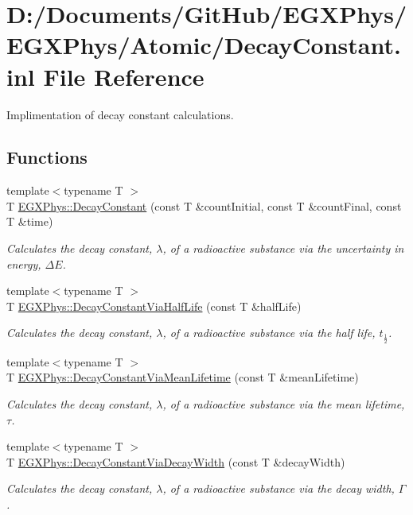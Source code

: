 \hypertarget{_decay_constant_8inl}{}\section{D\+:/\+Documents/\+Git\+Hub/\+E\+G\+X\+Phys/\+E\+G\+X\+Phys/\+Atomic/\+Decay\+Constant.inl File Reference}
\label{_decay_constant_8inl}


Implimentation of decay constant calculations.  


\subsection*{Functions}
\begin{DoxyCompactItemize}
\item 
{\footnotesize template$<$typename T $>$ }\\T \hyperlink{group___atomic_ga904edce5aad441b4a0873b3b1a83c7f2}{E\+G\+X\+Phys\+::\+Decay\+Constant} (const T \&count\+Initial, const T \&count\+Final, const T \&time)
\begin{DoxyCompactList}\small\item\em Calculates the decay constant, $\lambda$, of a radioactive substance via the uncertainty in energy, $\Delta E$. \end{DoxyCompactList}\item 
{\footnotesize template$<$typename T $>$ }\\T \hyperlink{group___atomic_ga89c04a655d9e24f976399cc8f173b7aa}{E\+G\+X\+Phys\+::\+Decay\+Constant\+Via\+Half\+Life} (const T \&half\+Life)
\begin{DoxyCompactList}\small\item\em Calculates the decay constant, $\lambda$, of a radioactive substance via the half life, $t_{\frac{1}{2}}$. \end{DoxyCompactList}\item 
{\footnotesize template$<$typename T $>$ }\\T \hyperlink{group___atomic_ga260cf6dc4f926269ea8966c19dfd269f}{E\+G\+X\+Phys\+::\+Decay\+Constant\+Via\+Mean\+Lifetime} (const T \&mean\+Lifetime)
\begin{DoxyCompactList}\small\item\em Calculates the decay constant, $\lambda$, of a radioactive substance via the mean lifetime, $\tau$. \end{DoxyCompactList}\item 
{\footnotesize template$<$typename T $>$ }\\T \hyperlink{group___atomic_gac0dc5d8a75657eaa2e939dd243fe4ba8}{E\+G\+X\+Phys\+::\+Decay\+Constant\+Via\+Decay\+Width} (const T \&decay\+Width)
\begin{DoxyCompactList}\small\item\em Calculates the decay constant, $\lambda$, of a radioactive substance via the decay width, $\Gamma$. \end{DoxyCompactList}\end{DoxyCompactItemize}


